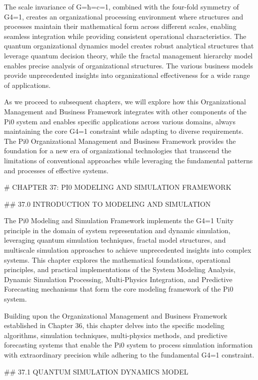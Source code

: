 The scale invariance of G=ħ=c=1, combined with the four-fold symmetry of G4=1, creates an organizational processing environment where structures and processes maintain their mathematical form across different scales, enabling seamless integration while providing consistent operational characteristics. The quantum organizational dynamics model creates robust analytical structures that leverage quantum decision theory, while the fractal management hierarchy model enables precise analysis of organizational structures. The various business models provide unprecedented insights into organizational effectiveness for a wide range of applications.

As we proceed to subsequent chapters, we will explore how this Organizational Management and Business Framework integrates with other components of the Pi0 system and enables specific applications across various domains, always maintaining the core G4=1 constraint while adapting to diverse requirements. The Pi0 Organizational Management and Business Framework provides the foundation for a new era of organizational technologies that transcend the limitations of conventional approaches while leveraging the fundamental patterns and processes of effective systems.

# CHAPTER 37: PI0 MODELING AND SIMULATION FRAMEWORK

## 37.0 INTRODUCTION TO MODELING AND SIMULATION

The Pi0 Modeling and Simulation Framework implements the G4=1 Unity principle in the domain of system representation and dynamic simulation, leveraging quantum simulation techniques, fractal model structures, and multiscale simulation approaches to achieve unprecedented insights into complex systems. This chapter explores the mathematical foundations, operational principles, and practical implementations of the System Modeling Analysis, Dynamic Simulation Processing, Multi-Physics Integration, and Predictive Forecasting mechanisms that form the core modeling framework of the Pi0 system.

Building upon the Organizational Management and Business Framework established in Chapter 36, this chapter delves into the specific modeling algorithms, simulation techniques, multi-physics methods, and predictive forecasting systems that enable the Pi0 system to process simulation information with extraordinary precision while adhering to the fundamental G4=1 constraint.

## 37.1 QUANTUM SIMULATION DYNAMICS MODEL

